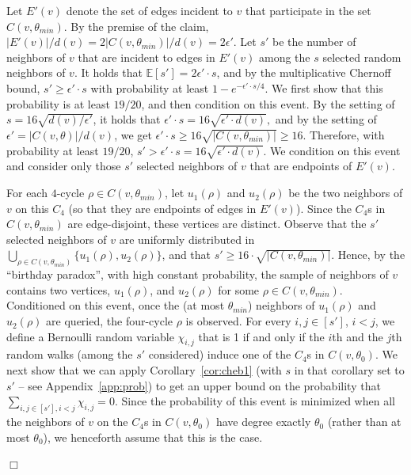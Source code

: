 \documentclass{article}
\newcommand{\eps}{\epsilon}
\newcommand{\Ex}{\mathbb{E}}
\newenvironment{proof}{\smallskip\noindent{\bf Proof:}}%
        {\hspace*{\fill}$\Box$\par}
\begin{document}
\begin{proof}
Let $E'(v)$ denote the set of edges incident to $v$ that participate in the set $C(v,\theta_{min})$. By the premise of the claim, $|E'(v)|/d(v)= 2|C(v,\theta_{min})|/d(v)= 2\eps'$. Let $s'$ be the number of neighbors  of $v$ that are incident to edges in $E'(v)$ among the $s$ selected random neighbors of $v$.
It holds that $\Ex[s']=2\eps' \cdot s$, and  by the multiplicative Chernoff bound, $s' \geq \eps' \cdot s$
with probability at least $1-e^{-\eps'\cdot s/4}$. 
We first show that this probability is at least $19/20$, and then condition on this event.
By the setting of $s=16\sqrt{d(v)/\eps'}$, it holds that $  \eps'\cdot s = 16\sqrt{\eps'\cdot d(v)},$ and by the setting of  $\eps'=|C(v,\theta)|/d(v)$, we get $\eps'\cdot s \geq 16\sqrt{|C(v, \theta_{min})|}\geq 16$. 
Therefore, with probability at least $19/20$, $s'>\eps'\cdot s= 16\sqrt{\eps' \cdot d(v)}$.
We condition on this event and consider only those $s'$ 
selected neighbors of $v$ that are endpoints of $E'(v)$.

For each $4$-cycle $\rho\in C(v,\theta_{min})$, let $u_1(\rho)$ and $u_2(\rho)$ be the two neighbors of $v$ on this $C_4$ (so that they are endpoints of edges in $E'(v)$). Since the $C_4$s in $C(v,\theta_{min})$ are edge-disjoint, these vertices are distinct. 
Observe that the $s'$ selected neighbors of $v$   are uniformly distributed in $\bigcup_{\rho\in C(v,\theta_{min})}\{u_1(\rho),u_2(\rho)\}$, and that $s' \geq 16\cdot\sqrt{|C(v,\theta_{min})|}$. Hence, by the ``birthday paradox'',  with high constant probability, the sample of neighbors of $v$ contains two vertices, $u_1(\rho)$, and $u_2(\rho)$
for some $\rho \in C(v,\theta_{min})$. 
Conditioned on this event, once the (at most $\theta_{min}$) neighbors of
$u_1(\rho)$ and $u_2(\rho)$ are queried, the four-cycle $\rho$ is observed.
\iffalse
For every $i,j \in [s']$, $i<j$, we define a Bernoulli random variable $\chi_{i,j}$ that is 1 if and only if the $i$th and the $j$th random walks (among the $s'$ considered) induce one of the $C_4$s in $C(v,\theta_0)$. We next show that we can apply Corollary~\ref{cor:cheb1} (with $s$ in that corollary set to $s'$ -- see Appendix~\ref{app:prob}) to get an upper bound on the probability that $\sum_{i,j \in [s'], i<j} \chi_{i,j} = 0$.
Since the probability of this event is minimized when all the neighbors of $v$ on the $C_4$s in $C(v,\theta_0)$ have degree exactly $\theta_0$ (rather than at most $\theta_0$), we henceforth assume that this is the case.


\end{proof}
\end{document}
